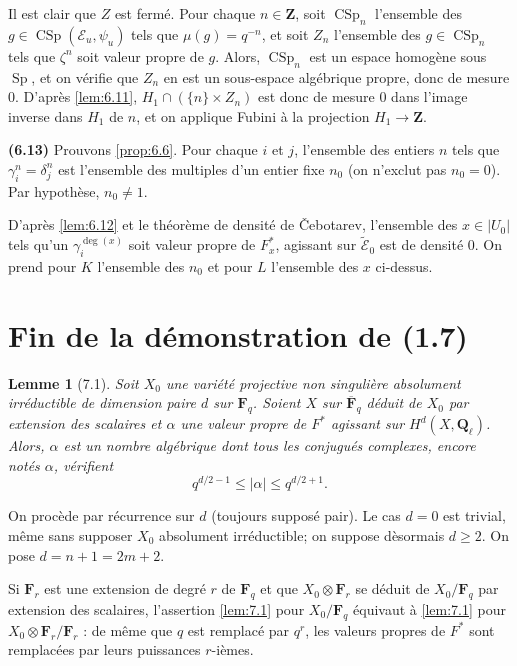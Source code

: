 \documentclass[12pt,a4paper]{amsart}
\theoremstyle{plain}
\newtheorem{lemme}[theoreme]{Lemme}
\theoremstyle{definition}
\theoremstyle{remark}
\DeclareMathOperator{\Sp}{Sp}
\DeclareMathOperator{\CSp}{CSp}
\newcommand{\Q}{\mathbf{Q}}
\newcommand{\Z}{\mathbf{Z}}
\newcommand{\F}{\mathbf{F}}
\numberwithin{equation}{section}
\begin{document}
Il est clair que $Z$ est ferm\'e. Pour chaque $n\in\Z$, soit $\CSp_n$ l'ensemble des $g\in\CSp(\mathscr{E}_u,\psi_u)$ tels que $\mu(g)=q^{-n}$, et soit $Z_n$ l'ensemble des $g\in\CSp_n$ tels que $\zeta^n$ soit valeur propre de $g$. Alors, $\CSp_n$ est un espace homog\`ene sous $\Sp$, et on v\'erifie que $Z_n$ en est un sous-espace alg\'ebrique propre, donc de mesure $0$. D'apr\`es \eqref{lem:6.11}, $H_1\cap(\{n\}\times Z_n)$ est donc de mesure $0$ dans l'image inverse dans $H_1$ de $n$, et on applique Fubini \`a la projection $H_1\to\Z$.

\noindent \textbf{(6.13)} Prouvons \eqref{prop:6.6}. Pour chaque $i$ et $j$, l'ensemble des entiers $n$ tels que $\gamma_i^n=\delta_j^n$ est l'ensemble des multiples d'un entier fixe $n_0$ (on n'exclut pas $n_0=0$). Par hypoth\`ese, $n_0\not=1$.

D'apr\`es \eqref{lem:6.12} et le th\'eor\`eme de densit\'e de \v{C}ebotarev, l'ensemble des $x\in|U_0|$ tels qu'un $\gamma_i^{\deg(x)}$ soit valeur propre de $F_x^*$, agissant sur $\widetilde{\mathscr{E}}_0$ est de densit\'e $0$. On prend pour $K$ l'ensemble des $n_0$ et pour $L$ l'ensemble des $x$ ci-dessus.


\section{Fin de la d\'emonstration de (1.7)}

\begin{lemme}[7.1]\label{lem:7.1}
Soit $X_0$ une vari\'et\'e projective non singuli\`ere absolument irr\'eductible de dimension paire $d$ sur $\F_q$. Soient $X$ sur $\overline{\F}_q$ d\'eduit de $X_0$ par extension des scalaires et $\alpha$ une valeur propre de $F^*$ agissant sur $H^d(X,\Q_\ell)$. Alors, $\alpha$ est un nombre alg\'ebrique dont tous les conjugu\'es complexes, encore not\'es $\alpha$, v\'erifient
\begin{equation}\label{eq:7.1.1}
q^{d/2-1} \le |\alpha| \le q^{d/2+1}.
\end{equation}
\end{lemme}

On proc\`ede par r\'ecurrence sur $d$ (toujours suppos\'e pair). Le cas $d=0$ est trivial, m\^eme sans supposer $X_0$ absolument irr\'eductible; on suppose d\`esormais $d\ge 2$. On pose $d=n+1=2m+2$.

Si $\F_r$ est une extension de degr\'e $r$ de $\F_q$ et que $X_0\otimes\F_r$ se d\'eduit de $X_0/\F_q$ par extension des scalaires, l'assertion \eqref{lem:7.1} pour $X_0/\F_q$ \'equivaut \`a \eqref{lem:7.1} pour $X_0\otimes\F_r/\F_r$ : de m\^eme que $q$ est remplac\'e par $q^r$, les valeurs propres de $F^*$ sont remplac\'ees par leurs puissances $r$-i\`emes.
\end{document}
